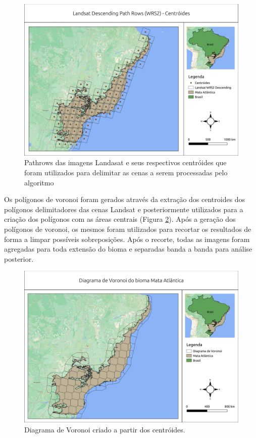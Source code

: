 \begin{figure}[h!]
    \centering
    \includegraphics[scale=.5]{images/ma_pathrow_centroids.pdf}
    \caption{Pathrows das imagens Landasat e seus respectivos centróides que foram utilizados para delimitar as cenas a serem processadas pelo algoritmo}
    \label{fig:pathrow_centroids}
\end{figure}

Os polígonos de voronoi foram gerados através da extração dos centroides dos polígonos delimitadores das cenas Landsat e posteriormente utilizados para a criação dos polígonos com as áreas centrais (Figura \ref{fig:voronoi_ma}). Após a geração dos polígonos de voronoi, os mesmos foram utilizados para recortar os resultados de forma a limpar possíveis sobreposições. Após o recorte, todas as imagens foram agregadas para toda extensão do bioma e separadas banda a banda para análise posterior.

\begin{figure}[H]
    \centering
    \includegraphics[scale=.5]{images/voronoi_mata_atlantica.pdf}
    \caption{Diagrama de Voronoi criado a partir dos centróides.}
    \label{fig:voronoi_ma}
\end{figure}


